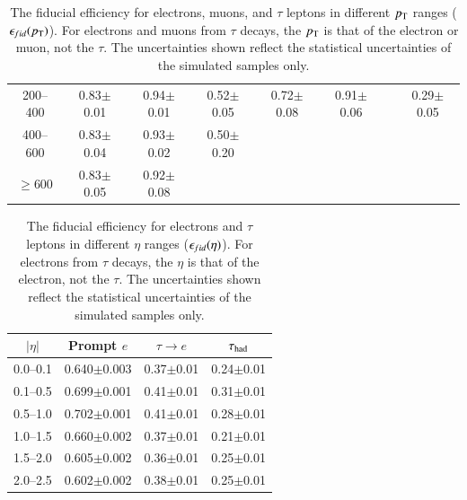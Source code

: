 \begin{table}[htbp]
\begin{center}
{\begin{tabular}{cccccccc}
200--400              & 0.83$\pm$0.01    & 0.94$\pm$0.01  & 0.52$\pm$0.05    & 0.72$\pm$0.08         & 0.91$\pm$0.06  &                   & 0.29$\pm$0.05\\ 
400--600              & 0.83$\pm$0.04    & 0.93$\pm$0.02  & 0.50$\pm$0.20    \\
$\ge 600$             & 0.83$\pm$0.05    & 0.92$\pm$0.08  &                  \\
 \hline \hline 
 \end{tabular} 
}
\caption{The fiducial efficiency for electrons, muons, and $\tau$ leptons in different $p_{\text{T}}$ ranges ($\epsilon_{fid}(p_{\text{T}})$).  For electrons and muons from $\tau$ decays, the $p_{\text{T}}$ is that of the electron or muon, not the $\tau$.  The uncertainties shown reflect the statistical uncertainties of the simulated samples only. }
 \label{table:model-independent-fideff-pt} 
 \end{center} 
 \end{table} 

\begin{table}[htbp]
\begin{center}
  {\small
 \begin{tabular}{cccc} 
 \hline \hline 
$|\eta|$ & Prompt $e$& $\tau\rightarrow e$& $\tau_\mathrm{had}$ \\ \hline 
0.0--0.1 & 0.640$\pm$0.003& 0.37$\pm$0.01&   0.24$\pm$0.01\\ 
0.1--0.5 & 0.699$\pm$0.001& 0.41$\pm$0.01&   0.31$\pm$0.01\\ 
0.5--1.0 & 0.702$\pm$0.001& 0.41$\pm$0.01&   0.28$\pm$0.01\\ 
1.0--1.5 & 0.660$\pm$0.002& 0.37$\pm$0.01&   0.21$\pm$0.01\\ 
1.5--2.0 & 0.605$\pm$0.002& 0.36$\pm$0.01&   0.25$\pm$0.01\\ 
2.0--2.5 & 0.602$\pm$0.002& 0.38$\pm$0.01&   0.25$\pm$0.01\\ 
 \hline \hline 
 \end{tabular} 
}
\caption{The fiducial efficiency for electrons and $\tau$ leptons in different $\eta$ ranges ($\epsfid(\eta)$). For electrons from $\tau$ decays, the $\eta$ is that of the electron, not the $\tau$.  The uncertainties shown reflect the statistical uncertainties of the simulated samples only.}

 \label{table:model-independent-fideff-eta} 
 \end{center} 
 \end{table}

